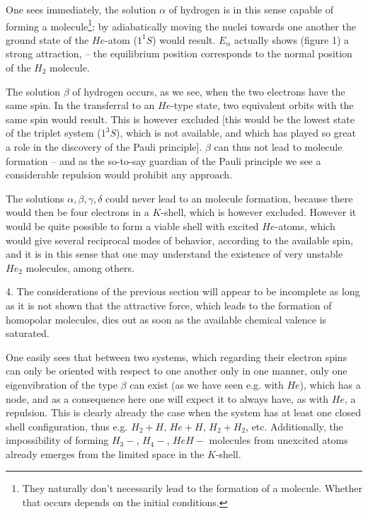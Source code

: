 \documentclass{article}
\begin{document}
One sees immediately, the solution $\alpha$ of hydrogen is in this sense capable of forming a molecule\footnote{They naturally don't necessarily lead to the formation of a molecule. Whether that occurs depends on the initial conditions.}: by adiabatically moving the nuclei towards one another the ground state of the $He$-atom ($1^1 S$) would result. $E_\alpha$ actually shows (figure 1) a strong attraction, -- the equilibrium position corresponds to the normal position of the $H_2$ molecule.

The solution $\beta$ of hydrogen occurs, as we see, when the two electrons have the same spin. In the transferral to an $He$-type state, two equivalent orbits with the same spin would result. This is however excluded [this would be the lowest state of the triplet system ($1^3 S$), which is not available, and which has played so great a role in the discovery of the Pauli principle]. $\beta$ can thus not lead to molecule formation -- and as the so-to-say guardian of the Pauli principle we see a considerable repulsion would prohibit any approach.

The solutions $\alpha,\beta,\gamma,\delta$ could never lead to an molecule formation, because there would then be four electrons in a $K$-shell, which is however excluded. However it would be quite possible to form a viable shell with excited $He$-atoms, which would give several reciprocal modes of behavior, according to the available spin, and it is in this sense that one may understand the existence of very unstable $He_2$ molecules, among others.

4. The considerations of the previous section will appear to be incomplete as long as it is not shown that the attractive force, which leads to the formation of homopolar molecules, dies out as soon as the available chemical valence is saturated.

One easily sees that between two systems, which regarding their electron spins can only be oriented with respect to one another only in one manner, only one eigenvibration of the type $\beta$ can exist (as we have seen e.g. with $He$), which has a node, and as a consequence here one will expect it to always have, as with $He$, a repulsion. This is clearly already the case when the system has at least one closed shell configuration, thus e.g. $H_2 + H$, $He + H$, $H_2 + H_2$, etc. Additionally, the impossibility of forming $H_3-$, $H_4-$, $HeH-$ molecules from unexcited atoms already emerges from the limited space in the $K$-shell.
\end{document}
